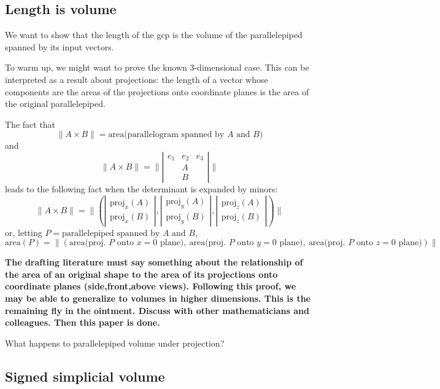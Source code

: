 \documentclass[10pt]{article}
\begin{document}
\subsection{Length is volume}

We want to show that the length of the gcp is the volume of the parallelepiped
spanned by its input vectors.

To warm up, we might want to prove the known 3-dimensional case.
This can be interpreted as a result about projections:
the length of a vector whose components are the areas of the projections onto coordinate
planes is the area of the original parallelepiped.

The fact that 
\[
  \|A \times B\| = \mbox{area(parallelogram spanned by $A$ and $B$)}
\]
and 
\[
  \|A \times B\| =
\| 
\left|
\begin{array}{ccc}
e_1 & e_2 & e_3 \\
& A \\
& B
\end{array}
\right|
\|
\]
leads to the following fact when the determinant is expanded by minors:
\[
\|A \times B\| = \|(
\left|
\begin{array}{c} 
\mbox{proj}_x (A) \\
\mbox{proj}_x (B)
\end{array}
\right|,
\left|
\begin{array}{c} 
\mbox{proj}_y (A) \\
\mbox{proj}_y (B)
\end{array}
\right|,
\left|
\begin{array}{c} 
\mbox{proj}_z (A) \\
\mbox{proj}_z (B)
\end{array}
\right|
)\|
\]
or, letting $P = \mbox{parallelepiped spanned by $A$ and $B$}$,
\[
\mbox{area}(P) = 
\|
(\mbox{area(proj. $P$ onto $x=0$ plane)},\ 
\mbox{area(proj. $P$ onto $y=0$ plane)},\ 
\mbox{area(proj. $P$ onto $z=0$ plane)})
\|
\]

{\bf The drafting literature must say something about the relationship of the
area of an original shape to the area of its projections onto coordinate planes
(side,front,above views). Following this proof, we may be able to generalize
to volumes in higher dimensions.
This is the remaining fly in the ointment.  Discuss with other mathematicians and colleagues.  Then this paper is done.}

What happens to parallelepiped volume under projection?

\subsection{Signed simplicial volume}
\end{document}

